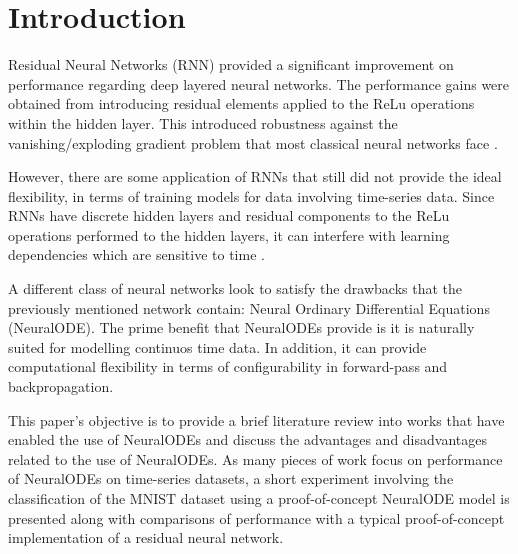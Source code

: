 \documentclass{article}
\begin{document}

\printAffiliationsAndNotice{} %


\section{Introduction}
\label{submission}

Residual Neural Networks (RNN) provided a significant improvement on performance regarding deep
layered neural networks. The performance gains were obtained from introducing residual elements applied
to the ReLu operations within the hidden layer. This introduced robustness against the vanishing/exploding gradient
problem that most classical neural networks face \cite{19Shorten}.

However, there are some application of RNNs that still did not provide the ideal flexibility, in terms
of training models for data involving time-series data. Since RNNs have discrete hidden layers and residual
components to the ReLu operations performed to the hidden layers, it can interfere with learning dependencies
which are sensitive to time \cite{23Walther}.

A different class of neural networks look to satisfy the drawbacks that the previously mentioned network contain:
Neural Ordinary Differential Equations (NeuralODE). The prime benefit that NeuralODEs provide is it is naturally suited for modelling continuos
time data. In addition, it can provide computational flexibility in terms of configurability in forward-pass and backpropagation. 

This paper's objective is to provide a brief literature review into works that have enabled the use of NeuralODEs and discuss the
advantages and disadvantages related to the use of NeuralODEs. As many pieces of work focus on performance of NeuralODEs on time-series datasets,
a short experiment involving the classification of the MNIST dataset using a proof-of-concept NeuralODE model 
is presented along with comparisons of performance with a typical proof-of-concept implementation of a residual neural network.
\end{document}
